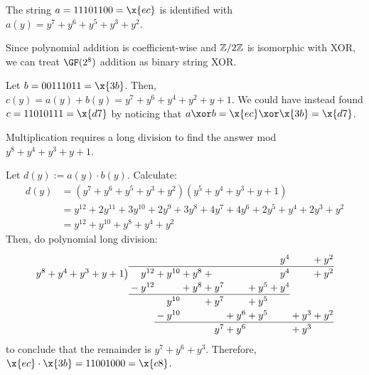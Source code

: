 \documentclass[class=co487,tikz,minted,notes]{agony}
\begin{document}
\begin{example}
  The string $a = 11101100 = \x{ec}$
  is identified with $a(y) = y^7 + y^6 + y^5 + y^3 + y^2$.
\end{example}

Since polynomial addition is coefficient-wise and $\mathbb{Z}/2\mathbb{Z}$ is isomorphic with XOR,
we can treat $\GF(2^8)$ addition as binary string XOR.

\begin{example}
  Let $b = 00111011 = \x{3b}$.
  Then, $c(y) = a(y) + b(y) = y^7 + y^6 + y^4 + y^2 + y + 1$.
  We could have instead found $c = 11010111 = \x{d7}$
  by noticing that $a \xor b = \x{ec} \xor \x{3b} = \x{d7}$.
\end{example}

Multiplication requires a long division to find the answer mod $y^8 + y^4 + y^3 + y + 1$.

\begin{example}\label{exa:mult}
  Let $d(y) := a(y) \cdot b(y)$. Calculate:
  \begin{align*}
    d(y) & = (y^7 + y^6 + y^5 + y^3 + y^2)(y^5 + y^4 + y^3 + y + 1)                           \\
         & = y^{12} + 2y^{11} + 3y^{10} + 2y^9 + 3y^8 + 4y^7 + 4y^6 + 2y^5 + y^4 + 2y^3 + y^2 \\
         & = y^{12} + y^{10} + y^8 + y^4 + y^2
  \end{align*}
  Then, do polynomial long division:
  \[
    \setlength\arraycolsep{0pt}
    \setlength\extrarowheight{2pt}
    \newcolumntype{q}{>{{}}c<{{}}}
    \begin{array}[t]{rqrqrqrqrqrqrqrqrqrqrqrqrqrqr}
                                     &   &        &   &        &   &     &   &     &   &     &   &     &   & y^4 &   &     & + & y^2 \\
      \cline{2-19}
      y^8 + y^4 + y^3 + y + 1 \bigl) &   & y^{12} & + & y^{10} & + & y^8 & + &     &   &     &   &     &   & y^4 &   &     & + & y^2 \\
                                     & - & y^{12} &   &        & + & y^8 & + & y^7 &   &     & + & y^5 & + & y^4                     \\
      \cline{2-15}
                                     &   &        &   & y^{10} &   &     & + & y^7 &   &     & + & y^5                               \\
                                     &   &        & - & y^{10} &   &     &   &     & + & y^6 & + & y^5 &   &     & + & y^3 & + & y^2 \\
      \cline{4-19}
                                     &   &        &   &        &   &     &   & y^7 & + & y^6 &   &     &   &     & + & y^3
    \end{array}
  \]
  to conclude that the remainder is $y^7 + y^6 + y^3$.
  Therefore, $\x{ec} \cdot \x{3b} = 11001000 = \x{c8}$.
\end{example}
\end{document}
